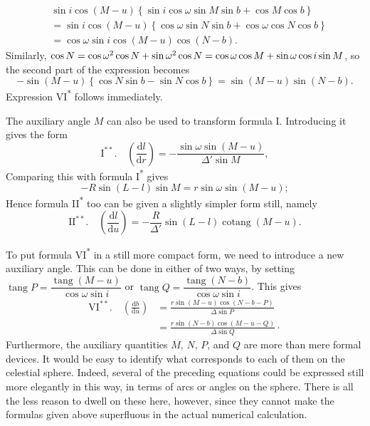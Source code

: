\[
\begin{aligned}
&\sin i\cos(M-u)\left\{\sin i\cos\omega\sin M\sin b + \cos M\cos b\right\}\\
&= \sin i\cos(M-u)\left\{\cos\omega\sin N\sin b + \cos\omega\cos N\cos b\right\}\\
&= \cos\omega\sin i\cos(M-u)\cos(N-b).
\end{aligned}
\]
\noindent Similarly, $\cos N =\allowbreak \cos\omega^2\cos N +\allowbreak \sin\omega^2\cos N =\hfil\penalty-10000 \cos\omega\cos M +\allowbreak \sin\omega\cos i\sin M$, so the second part of the expression becomes
\[
-\sin(M-u)\left\{\cos N\sin b - \sin N\cos b\right\} = \sin(M-u)\sin(N-b).
\]
\noindent Expression VI\textsuperscript{*} follows immediately.

The auxiliary angle $M$ can also be used to transform formula I. Introducing it gives the form
\[
\mathrm{I}^{**}.\quad \left(\frac{\mathrm{d}l}{\mathrm{d}r}\right) = -\frac{\sin\omega\sin(M-u)}{\Delta'\sin M},
\]
\noindent Comparing this with formula I\textsuperscript{*} gives
\[
-R\sin(L-l)\sin M = r\sin\omega\sin(M-u);
\]
\noindent Hence formula II\textsuperscript{*} too can be given a slightly simpler form still, namely
\[
\mathrm{II}^{**}.\quad \left(\frac{\mathrm{d}l}{\mathrm{d}u}\right) = -\frac{R}{\Delta'}\sin(L-l)\operatorname{cotang}(M-u).
\]

To put formula VI\textsuperscript{*} in a still more compact form, we need to introduce a new auxiliary angle. This can be done in either of two ways, by setting $\operatorname{tang}P=\dfrac{\operatorname{tang}(M-u)}{\cos\omega\sin i}$ or $\operatorname{tang}Q=\dfrac{\operatorname{tang}(N-b)}{\cos\omega\sin i}$. This gives
\[
\begin{aligned}
\mathrm{VI}^{**}.\quad \left(\frac{\mathrm{d}b}{\mathrm{d}u}\right) &= \frac{r\sin(M-u)\cos(N-b-P)}{\Delta\sin P}\\
& = \frac{r\sin(N-b)\cos(M-u-Q)}{\Delta\sin Q}\mathpunct{\cdot}
\end{aligned}
\]
\noindent Furthermore, the auxiliary quantities $M$, $N$, $P$, and $Q$ are more than mere formal devices. It would be easy to identify what corresponds to each of them on the celestial sphere. Indeed, several of the preceding equations could be expressed still more elegantly in this way, in terms of arcs or angles on the sphere. There is all the less reason to dwell on these here, however, since they cannot make the formulas given above superfluous in the actual numerical calculation.

